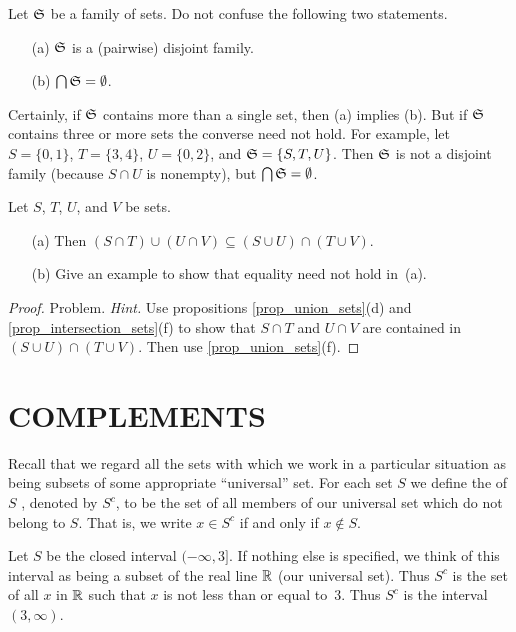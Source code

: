 \begin{cau} Let $\mathfrak{S}$ be a family of sets.  Do not confuse the following two statements.
 \begin{enumerate}
   \item[(a)] $\mathfrak{S}$ is a (pairwise) disjoint family.
   \item[(b)] $\bigcap \mathfrak{S} = \emptyset$.
 \end{enumerate}
Certainly, if $\mathfrak{S}$ contains more than a single set, then (a) implies (b).  But if
$\mathfrak{S}$ contains three or more sets the converse need not hold.  For example, let $S =
\{0,1\}$, $T = \{3,4\}$, $U = \{0,2\}$, and $\mathfrak{S} = \{S,T,U\}$.  Then $\mathfrak{S}$ is not
a disjoint family (because $S \cap U$ is nonempty), but $\bigcap\mathfrak{S} = \emptyset$.
\end{cau}

\begin{exam} Let $S$, $T$, $U$, and $V$ be sets.
 \begin{enumerate}
   \item[(a)] Then $(S \cap T) \cup (U \cap V) \subseteq (S \cup U)
\cap (T \cup V)$.
   \item[(b)] Give an example to show that equality need not hold
in~(a).
 \end{enumerate}
\end{exam}

\begin{proof} Problem.  \emph{Hint.}  Use propositions \ref{prop_union_sets}(d)  and
\ref{prop_intersection_sets}(f) to show that $S \cap T$ and $U \cap V$ are contained in $(S
\cup U) \cap (T \cup V)$.  Then use \ref{prop_union_sets}(f).   \ns
\end{proof}







\section{COMPLEMENTS} Recall that we regard all the sets with which we work in a particular
situation as being subsets of some appropriate ``universal'' set.  For each set  $S$  we
define the
 of  $S$ , denoted by  $S^c$, to be the set of all members of our universal set
which do not belong to $S$.  That is, we write $x \in S^c$ if and only if $x \notin S$.

\begin{exam} Let $S$ be the closed interval  $(-\infty, 3]$.  If nothing else is specified,
we think of this interval as being a subset of the real  line $\mathbb{R}$ (our universal set).  Thus
$S^c$ is the set of all  $x $ in $\mathbb{R}$ such that $x$ is not less than or equal to~$3$.  Thus
$S^c$ is the interval $(3,\infty)$.
\end{exam}

